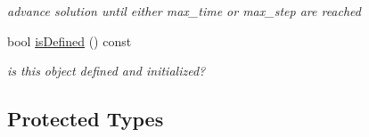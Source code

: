 \begin{DoxyCompactItemize}
\begin{DoxyCompactList}\small\item\em advance solution until either max\-\_\-time or max\-\_\-step are reached \end{DoxyCompactList}\item 
\hypertarget{classamr_mushy_layer_a2e73f3e60e9bbc8741a7d2be51a3dbb5}{bool \hyperlink{classamr_mushy_layer_a2e73f3e60e9bbc8741a7d2be51a3dbb5}{is\-Defined} () const }\label{classamr_mushy_layer_a2e73f3e60e9bbc8741a7d2be51a3dbb5}

\begin{DoxyCompactList}\small\item\em is this object defined and initialized? \end{DoxyCompactList}\end{DoxyCompactItemize}
\subsection*{Protected Types}
